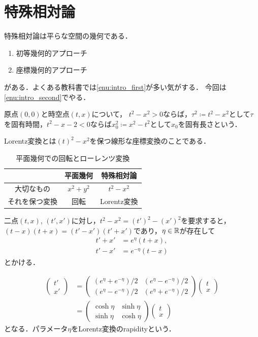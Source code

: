 \section{特殊相対論}
特殊相対論は平らな空間の幾何である．

\begin{enumerate}
		\item 初等幾何的アプローチ\label{enu:intro_first}
		\item 座標幾何的アプローチ\label{enu:intro_second}
\end{enumerate}
がある．よくある教科書では\ref{enu:intro_first}が多い気がする．
今回は\ref{enu:intro_second}でやる．

原点$(0, 0) $と時空点$(t, x) $について，
$t^2 -x^2 > 0 $ならば，$\tau^2\coloneqq t^2 - x^2 $として$\tau $を固有時間，$t^2 - x-2 < 0 $ならば$x_0^2\coloneqq x^2 - t^2 $として$x_0 $を固有長さという．

Lorentz変換とは$(t)^2 - x^2 $を保つ線形な座標変換のことである．
\begin{table}[htbp]
		\centering
		\label{tab:Lorentz-rotation}
		\caption{平面幾何での回転とローレンツ変換}
		\begin{tabular}{c|cc}\hline
				 & 平面幾何 & 特殊相対論\\\hline
				大切なもの & $x^2 + y^2 $ & $t^2 - x^2 $\\
				それを保つ変換 & 回転 & Lorentz変換\\\hline
		\end{tabular}
\end{table}

二点$(t, x) $, $(t', x') $に対し，$t^2 -x^2 = (t')^2 - (x')^2 $を要求すると，$(t-x)(t+x) = (t'-x')(t'+x') $であり，$\eta\in\mathbb{R} $が存在して
\begin{align}
		t' + x' &= e^{\eta}(t + x),\\
		t' - x' &= e^{-\eta}(t-x)
\end{align}とかける．

\begin{align}
		\begin{pmatrix}
				t'\\
				x'
		\end{pmatrix}
		&=
		\begin{pmatrix}
				(e^\eta + e^{-\eta})/2 & (e^{\eta} - e^{-\eta})/2\\
				(e^{\eta}-e^{-\eta})/2 & (e^{\eta}+e^{-\eta})/2
		\end{pmatrix}
		\begin{pmatrix}
				t\\
				x
		\end{pmatrix}
		\\
		&= \begin{pmatrix}
				\cosh\eta & \sinh\eta\\
				\sinh\eta & \cosh\eta
		\end{pmatrix}
		\begin{pmatrix}
				t\\
				x
		\end{pmatrix}
\end{align}
となる．パラメータ$\eta $をLorentz変換のrapidityという．

